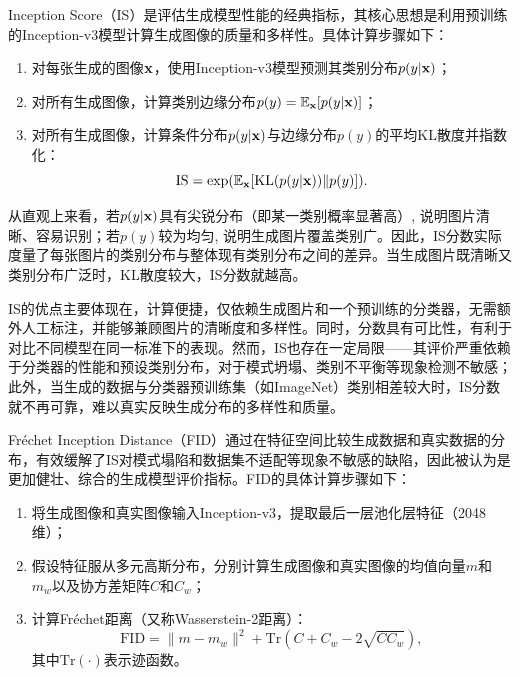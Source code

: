 \documentclass[11pt,a4paper,UTF8]{ctexart}
\begin{document}
Inception Score（IS）\cite{salimans2016improved}是评估生成模型性能的经典指标，其核心思想是利用预训练的Inception-v3模型\cite{szegedy2016rethinking}计算生成图像的质量和多样性。具体计算步骤如下：
\begin{tcolorbox}
\begin{enumerate}
    \item 对每张生成的图像$\mathbf{x}$，使用Inception-v3模型预测其类别分布$p(y|\mathbf{x})$；
    \item 对所有生成图像，计算类别边缘分布$p(y)=\mathbb{E}_{\mathbf{x}}[p(y|\mathbf{x})]$；
    \item 对所有生成图像，计算条件分布$p(y|\mathbf{x})$与边缘分布$p(y)$的平均KL散度并指数化： \begin{equation*}
        \text{IS} =\exp(\mathbb{E}_{\mathbf{x}}[\text{KL}(p(y|\mathbf{x}))\|p(y)]).
    \end{equation*}
\end{enumerate}
\end{tcolorbox}

从直观上来看，若$p(y|\mathbf{x})$具有尖锐分布（即某一类别概率显著高）, 说明图片清晰、容易识别；若$p(y)$较为均匀, 说明生成图片覆盖类别广。因此，IS分数实际度量了每张图片的类别分布与整体现有类别分布之间的差异。当生成图片既清晰又类别分布广泛时，KL散度较大，IS分数就越高。

IS的优点主要体现在，计算便捷，仅依赖生成图片和一个预训练的分类器，无需额外人工标注，并能够兼顾图片的清晰度和多样性。同时，分数具有可比性，有利于对比不同模型在同一标准下的表现。然而，IS也存在一定局限——其评价严重依赖于分类器的性能和预设类别分布，对于模式坍塌、类别不平衡等现象检测不敏感；此外，当生成的数据与分类器预训练集（如ImageNet）类别相差较大时，IS分数就不再可靠，难以真实反映生成分布的多样性和质量。

Fr\'echet Inception Distance（FID）\cite{dowson1982frechet}通过在特征空间比较生成数据和真实数据的分布，有效缓解了IS对模式塌陷和数据集不适配等现象不敏感的缺陷，因此被认为是更加健壮、综合的生成模型评价指标。FID的具体计算步骤如下：
\begin{tcolorbox}
\begin{enumerate}
    \item 将生成图像和真实图像输入Inception-v3，提取最后一层池化层特征（2048维）；
    \item 假设特征服从多元高斯分布，分别计算生成图像和真实图像的均值向量$m$和$m_w$以及协方差矩阵$C$和$C_w$；
    \item 计算Fr\'echet距离（又称Wasserstein-2距离）：
    \begin{equation*}
        \text{FID}=\|m-m_w \|^2 + \text{Tr}(C+C_w-2\sqrt{CC_w}),
    \end{equation*}
    其中$\text{Tr}(\cdot)$表示迹函数。
\end{enumerate}
\end{tcolorbox}
\end{document}
